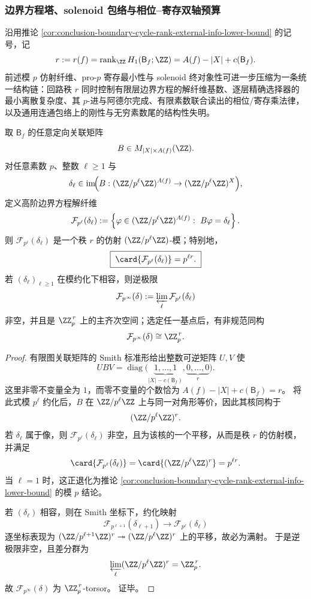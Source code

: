 \subsubsection{边界方程塔、solenoid 包络与相位--寄存双轴预算}\label{subsubsec:conclusion-boundary-padic-solenoid-phase-ledger}
沿用推论 \ref{cor:conclusion-boundary-cycle-rank-external-info-lower-bound} 的记号，记
\[
r:=r(f)=\operatorname{rank}_{\ZZ}H_1(\mathsf B_f;\ZZ)=A(f)-|X|+c(\mathsf B_f).
\]
前述模 \(p\) 仿射纤维、pro-\(p\) 寄存最小性与 solenoid 终对象性可进一步压缩为一条统一结构链：回路秩 \(r\) 同时控制有限层边界方程的解纤维基数、逐层精确选择器的最小离散复杂度、其 \(p\)-进与阿德尔完成、有限素数联合读出的相位/寄存乘法律，以及通用连通包络上的刚性与无穷素数尾的结构性失明。

\begin{theorem}[\(p\)-进边界方程塔与精确秩]\label{thm:conclusion-boundary-padic-tower-exact-rank}
取 \(\mathsf B_f\) 的任意定向关联矩阵
\[
B\in M_{|X|\times A(f)}(\ZZ).
\]
对任意素数 \(p\)、整数 \(\ell\ge 1\) 与
\[
\delta_\ell\in \operatorname{im}\!\Bigl(B:(\ZZ/p^\ell\ZZ)^{A(f)}\to (\ZZ/p^\ell\ZZ)^{X}\Bigr),
\]
定义高阶边界方程解纤维
\[
\mathcal F_{p^\ell}(\delta_\ell)
:=
\left\{
\varphi\in (\ZZ/p^\ell\ZZ)^{A(f)}:\ B\varphi=\delta_\ell
\right\}.
\]
则 \(\mathcal F_{p^\ell}(\delta_\ell)\) 是一个秩 \(r\) 的仿射 \((\ZZ/p^\ell\ZZ)\)-模；特别地，
\[
\boxed{\;
\card{\mathcal F_{p^\ell}(\delta_\ell)}=p^{\ell r}.
\;}
\]
若 \((\delta_\ell)_{\ell\ge 1}\) 在模约化下相容，则逆极限
\[
\mathcal F_{p^\infty}(\delta)
:=
\varprojlim_{\ell}\mathcal F_{p^\ell}(\delta_\ell)
\]
非空，并且是 \(\ZZ_p^{\,r}\) 上的主齐次空间；选定任一基点后，有非规范同构
\[
\mathcal F_{p^\infty}(\delta)\cong \ZZ_p^{\,r}.
\]
\end{theorem}
\begin{proof}
有限图关联矩阵的 Smith 标准形给出整数可逆矩阵 \(U,V\) 使
\[
UBV=\operatorname{diag}\!\bigl(
\underbrace{1,\dots,1}_{|X|-c(\mathsf B_f)},
\underbrace{0,\dots,0}_{r}
\bigr).
\]
这里非零不变量全为 \(1\)，而零不变量的个数恰为
\(
A(f)-|X|+c(\mathsf B_f)=r
\)。
将此式模 \(p^\ell\) 约化后，\(B\) 在 \(\ZZ/p^\ell\ZZ\) 上与同一对角形等价，因此其核同构于
\[
(\ZZ/p^\ell\ZZ)^{r}.
\]
若 \(\delta_\ell\) 属于像，则 \(\mathcal F_{p^\ell}(\delta_\ell)\) 非空，且为该核的一个平移，从而是秩 \(r\) 的仿射模，并满足
\[
\card{\mathcal F_{p^\ell}(\delta_\ell)}
=
\card{(\ZZ/p^\ell\ZZ)^r}
=
p^{\ell r}.
\]
当 \(\ell=1\) 时，这正退化为推论 \ref{cor:conclusion-boundary-cycle-rank-external-info-lower-bound} 的模 \(p\) 结论。

若 \((\delta_\ell)\) 相容，则在 Smith 坐标下，约化映射
\[
\mathcal F_{p^{\ell+1}}(\delta_{\ell+1})\to \mathcal F_{p^\ell}(\delta_\ell)
\]
逐坐标表现为
\(
(\ZZ/p^{\ell+1}\ZZ)^r\twoheadrightarrow(\ZZ/p^\ell\ZZ)^r
\)
上的平移，故必为满射。
于是逆极限非空，且差分群为
\[
\varprojlim_\ell(\ZZ/p^\ell\ZZ)^r=\ZZ_p^{\,r}.
\]
故 \(\mathcal F_{p^\infty}(\delta)\) 为 \(\ZZ_p^{\,r}\)-torsor。
证毕。
\end{proof}

